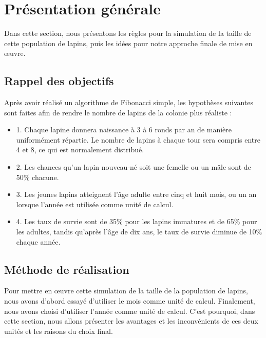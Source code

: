 \documentclass[12pt]{article}
\begin{document}
    \newpage
    \listoftables
    \listoffigures
    \newpage
    \section{Présentation générale}
    Dans cette section, nous présentons les règles pour la simulation de la taille de cette population de lapins, puis les idées pour notre approche finale de mise en œuvre.
        \subsection{Rappel des objectifs}
        Après avoir réalisé un algorithme de Fibonacci simple, les hypothèses suivantes sont faites afin de rendre le nombre de lapins de la colonie plus réaliste : 
        \begin{itemize}
            \item 1. Chaque lapine donnera naissance à 3 à 6 ronds par an de manière uniformément répartie. Le nombre de lapins à chaque tour sera compris entre 4 et 8, ce qui est normalement distribué.
            \item 2. Les chances qu'un lapin nouveau-né soit une femelle ou un mâle sont de 50\% chacune.
            \item 3. Les jeunes lapins atteignent l'âge adulte entre cinq et huit mois, ou un an lorsque l'année est utilisée comme unité de calcul.
            \item 4. Les taux de survie sont de 35\% pour les lapins immatures et de 65\% pour les adultes, tandis qu'après l'âge de dix ans, le taux de survie diminue de 10\% chaque année.
        \end{itemize}
        
        \subsection{Méthode de réalisation}
        Pour mettre en œuvre cette simulation de la taille de la population de lapins, nous avons d'abord essayé d'utiliser le mois comme unité de calcul. Finalement, nous avons choisi d'utiliser l'année comme unité de calcul. C'est pourquoi, dans cette section, nous allons présenter les avantages et les inconvénients de ces deux unités et les raisons du choix final.
\end{document}
